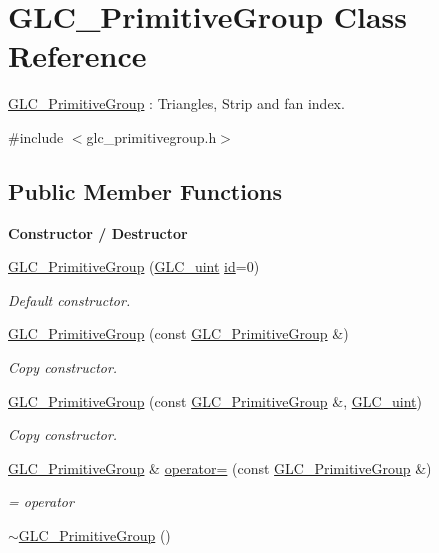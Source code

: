 \hypertarget{class_g_l_c___primitive_group}{\section{G\-L\-C\-\_\-\-Primitive\-Group Class Reference}
\label{class_g_l_c___primitive_group}
}


\hyperlink{class_g_l_c___primitive_group}{G\-L\-C\-\_\-\-Primitive\-Group} \-: Triangles, Strip and fan index.  




{\ttfamily \#include $<$glc\-\_\-primitivegroup.\-h$>$}

\subsection*{Public Member Functions}
\begin{Indent}{\bf Constructor / Destructor}\par
\begin{DoxyCompactItemize}
\item 
\hyperlink{class_g_l_c___primitive_group_a4ca77b5fa1b5a487f17aac5303f3be1b}{G\-L\-C\-\_\-\-Primitive\-Group} (\hyperlink{glc__global_8h_abf950976fabed69026558df8e2da6c6b}{G\-L\-C\-\_\-uint} \hyperlink{glext_8h_a58c2a664503e14ffb8f21012aabff3e9}{id}=0)
\begin{DoxyCompactList}\small\item\em Default constructor. \end{DoxyCompactList}\item 
\hyperlink{class_g_l_c___primitive_group_a10c03cfdb0af99b913c4e501345ab149}{G\-L\-C\-\_\-\-Primitive\-Group} (const \hyperlink{class_g_l_c___primitive_group}{G\-L\-C\-\_\-\-Primitive\-Group} \&)
\begin{DoxyCompactList}\small\item\em Copy constructor. \end{DoxyCompactList}\item 
\hyperlink{class_g_l_c___primitive_group_a6205327db215f93eb19b4a08741634fd}{G\-L\-C\-\_\-\-Primitive\-Group} (const \hyperlink{class_g_l_c___primitive_group}{G\-L\-C\-\_\-\-Primitive\-Group} \&, \hyperlink{glc__global_8h_abf950976fabed69026558df8e2da6c6b}{G\-L\-C\-\_\-uint})
\begin{DoxyCompactList}\small\item\em Copy constructor. \end{DoxyCompactList}\item 
\hyperlink{class_g_l_c___primitive_group}{G\-L\-C\-\_\-\-Primitive\-Group} \& \hyperlink{class_g_l_c___primitive_group_a0d78a1cf901e184638f628bb2a8a8c49}{operator=} (const \hyperlink{class_g_l_c___primitive_group}{G\-L\-C\-\_\-\-Primitive\-Group} \&)
\begin{DoxyCompactList}\small\item\em = operator \end{DoxyCompactList}\item 
\hyperlink{class_g_l_c___primitive_group_a15012f78cda424df29e541451852552e}{$\sim$\-G\-L\-C\-\_\-\-Primitive\-Group} ()
\end{DoxyCompactItemize}
\end{Indent}
